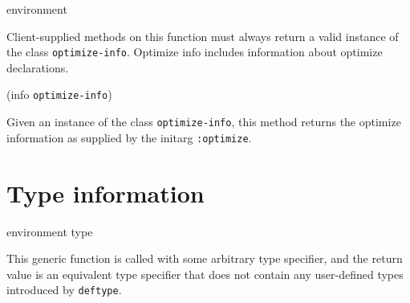  {environment}

Client-supplied methods on this function must always return a valid
instance of the class \texttt{optimize-info}. Optimize info includes
information about optimize declarations.


 {(info {\tt optimize-info})}

Given an instance of the class \texttt{optimize-info}, this method 
returns the optimize information as supplied by the initarg
\texttt{:optimize}.

\section{Type information}

 {environment type}

This generic function is called with some arbitrary type specifier,
and the return value is an equivalent type specifier that does not
contain any user-defined types introduced by \texttt{deftype}. 
